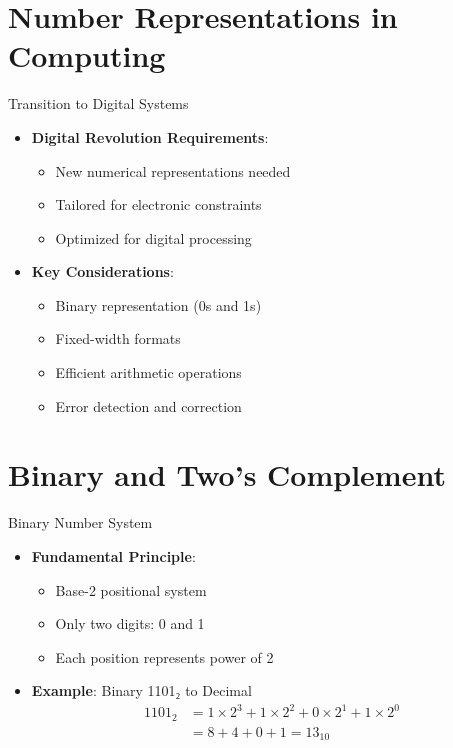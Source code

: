 \documentclass[aspectratio=169,11pt]{beamer}
\newcommand{\concept}[1]{\textbf{\color{accentcolor}#1}}
\begin{document}
\section{Number Representations in Computing}

\begin{frame}{Transition to Digital Systems}
\begin{itemize}
\item \concept{Digital Revolution Requirements}:
\begin{itemize}
\item New numerical representations needed
\item Tailored for electronic constraints
\item Optimized for digital processing
\end{itemize}
\vspace{0.5cm}
\item \concept{Key Considerations}:
\begin{itemize}
\item Binary representation (0s and 1s)
\item Fixed-width formats
\item Efficient arithmetic operations
\item Error detection and correction
\end{itemize}
\end{itemize}
\end{frame}

\section{Binary and Two's Complement}

\begin{frame}{Binary Number System}
\begin{itemize}
\item \concept{Fundamental Principle}:
\begin{itemize}
\item Base-2 positional system
\item Only two digits: 0 and 1
\item Each position represents power of 2
\end{itemize}
\vspace{0.5cm}
\item \concept{Example}: Binary 1101₂ to Decimal
\begin{align}
1101_2 &= 1 \times 2^3 + 1 \times 2^2 + 0 \times 2^1 + 1 \times 2^0\\
&= 8 + 4 + 0 + 1 = 13_{10}
\end{align}
\end{itemize}
\end{frame}
\end{document}
